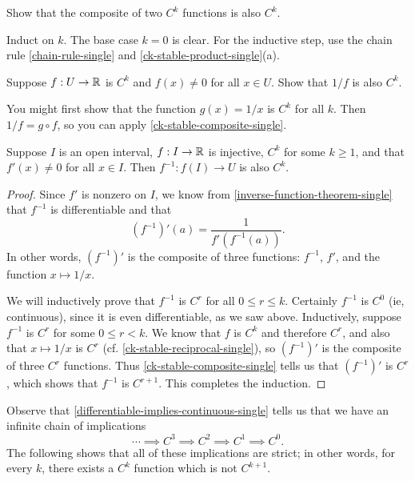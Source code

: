 \begin{exercise} \label{ck-stable-composite-single}
	Show that the composite of two $C^k$ functions is also $C^k$. \begin{hint} Induct on $k$. The base case $k = 0$ is clear. For the inductive step, use the chain rule \ref{chain-rule-single} and \cref{ck-stable-product-single}(a). \end{hint}
\end{exercise}

\begin{exercise} \label{ck-stable-reciprocal-single}
	Suppose $f : U \to \mathbb{R}$ is $C^k$ and $f(x) \neq 0$ for all $x \in U$. Show that $1/f$ is also $C^k$.
	\begin{hint}
		You might first show that the function $g(x) = 1/x$ is $C^k$ for all $k$. Then $1/f = g \circ f$, so you can apply \cref{ck-stable-composite-single}. 
	\end{hint}
\end{exercise}

\begin{proposition} \label{ck-stable-inversion-single}
	Suppose $I$ is an open interval, $f : I \to \mathbb{R}$ is injective, $C^k$ for some $k \geq 1$, and that $f'(x) \neq 0$ for all $x \in I$. Then $f^{-1} : f(I) \to U$ is also $C^k$. 
\end{proposition}

\begin{proof}
	Since $f'$ is nonzero on $I$, we know from \cref{inverse-function-theorem-single} that $f^{-1}$ is differentiable and that
	\[ (f^{-1})'(a) = \frac{1}{f'(f^{-1}(a))}. \]
	In other words, $(f^{-1})'$ is the composite of three functions: $f^{-1}$, $f'$, and the function $x \mapsto 1/x$. 
	
	We will inductively prove that $f^{-1}$ is $C^r$ for all $0 \leq r \leq k$. Certainly $f^{-1}$ is $C^0$ (ie, continuous), since it is even differentiable, as we saw above. Inductively, suppose $f^{-1}$ is $C^r$ for some $0 \leq r < k$. We know that $f$ is $C^k$ and therefore $C^r$, and also that $x \mapsto 1/x$ is $C^r$ (cf. \cref{ck-stable-reciprocal-single}), so $(f^{-1})'$ is the composite of three $C^r$ functions. Thus \cref{ck-stable-composite-single} tells us that $(f^{-1})'$ is $C^r$, which shows that $f^{-1}$ is $C^{r+1}$. This completes the induction.  
\end{proof}

Observe that \cref{differentiable-implies-continuous-single} tells us that we have an infinite chain of implications
\[ \dotsb \implies C^3 \implies C^2 \implies C^1 \implies C^0. \]
The following shows that all of these implications are strict; in other words, for every $k$, there exists a $C^k$ function which is not $C^{k+1}$.

